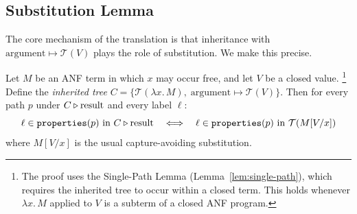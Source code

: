\subsection{Substitution Lemma}

The core mechanism of the translation is that inheritance with
$\mathrm{argument} \mapsto \mathcal{T}(V)$ plays the role of
substitution.  We make this precise.

\begin{lemma}[Substitution]\label{lem:substitution}
  Let $M$ be an ANF term in which $x$ may occur free,
  and let $V$ be a closed value.%
  \footnote{
    The proof uses the Single-Path Lemma
    (Lemma~\ref{lem:single-path}), which requires the inherited tree
    to occur within a closed term. This holds whenever
    $\lambda x.\, M$ applied to $V$ is a subterm of a closed ANF
    program.
  }
  Define the \emph{inherited tree}
  $C = \{\mathcal{T}(\lambda x.\, M),\;
  \mathrm{argument} \mapsto \mathcal{T}(V)\}$.
  Then for every path $p$ under $C \mathbin{\triangleright} \mathrm{result}$ and
  every label $\ell$:
  \[
    \ell \in \mathtt{properties}(p)
    \text{ in } C \mathbin{\triangleright} \mathrm{result}
    \quad\Longleftrightarrow\quad
    \ell \in \mathtt{properties}(p)
    \text{ in } \mathcal{T}(M[V/x])
  \]
  where $M[V/x]$ is the usual capture-avoiding substitution.
\end{lemma}

